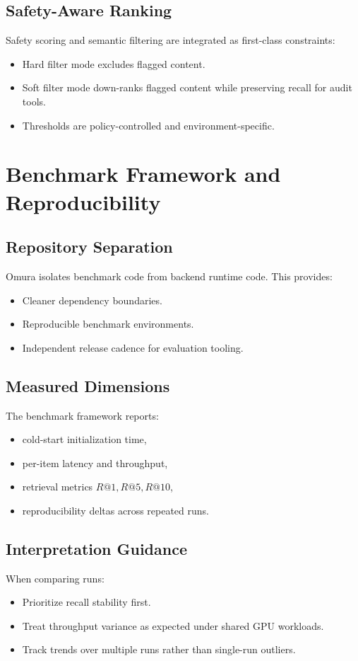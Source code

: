 \documentclass[11pt]{article}
\begin{document}
\subsection{Safety-Aware Ranking}
Safety scoring and semantic filtering are integrated as first-class constraints:
\begin{itemize}[leftmargin=1.2em]
  \item Hard filter mode excludes flagged content.
  \item Soft filter mode down-ranks flagged content while preserving recall for audit tools.
  \item Thresholds are policy-controlled and environment-specific.
\end{itemize}

\section{Benchmark Framework and Reproducibility}
\subsection{Repository Separation}
Omura isolates benchmark code from backend runtime code. This provides:
\begin{itemize}[leftmargin=1.2em]
  \item Cleaner dependency boundaries.
  \item Reproducible benchmark environments.
  \item Independent release cadence for evaluation tooling.
\end{itemize}

\subsection{Measured Dimensions}
The benchmark framework reports:
\begin{itemize}[leftmargin=1.2em]
  \item cold-start initialization time,
  \item per-item latency and throughput,
  \item retrieval metrics \(R@1, R@5, R@10\),
  \item reproducibility deltas across repeated runs.
\end{itemize}

\subsection{Interpretation Guidance}
When comparing runs:
\begin{itemize}[leftmargin=1.2em]
  \item Prioritize recall stability first.
  \item Treat throughput variance as expected under shared GPU workloads.
  \item Track trends over multiple runs rather than single-run outliers.
\end{itemize}
\end{document}
